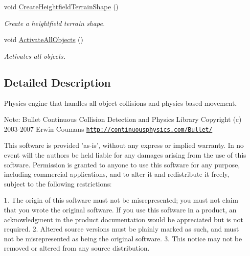\begin{CompactItemize}
void \hyperlink{class_physics_engine_f951fe2e462f4b487b653199298a1bb3}{CreateHeightfieldTerrainShape} ()
\begin{CompactList}\small\item\em Create a heightfield terrain shape. \item\end{CompactList}\item 
void \hyperlink{class_physics_engine_2e877a86ca85b2ec58b3c046af057d76}{ActivateAllObjects} ()
\begin{CompactList}\small\item\em Activates all objects. \item\end{CompactList}\end{CompactItemize}


\subsection{Detailed Description}
Physics engine that handles all object collisions and physics based movement. 

\begin{Desc}
\item[Note:]Bullet Continuous Collision Detection and Physics Library Copyright (c) 2003-2007 Erwin Coumans \href{http://continuousphysics.com/Bullet/}{\tt http://continuousphysics.com/Bullet/}\end{Desc}
This software is provided 'as-is', without any express or implied warranty. In no event will the authors be held liable for any damages arising from the use of this software. Permission is granted to anyone to use this software for any purpose, including commercial applications, and to alter it and redistribute it freely, subject to the following restrictions:

1. The origin of this software must not be misrepresented; you must not claim that you wrote the original software. If you use this software in a product, an acknowledgment in the product documentation would be appreciated but is not required. 2. Altered source versions must be plainly marked as such, and must not be misrepresented as being the original software. 3. This notice may not be removed or altered from any source distribution.

